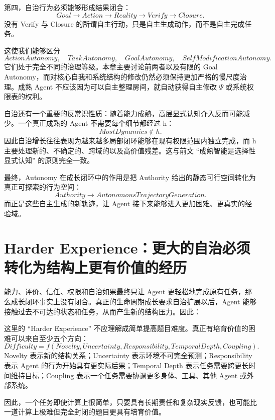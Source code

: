 第四，自治行为必须能够形成结果闭合：
\[
Goal
\rightarrow
Action
\rightarrow
Reality
\rightarrow
Verify
\rightarrow
Closure.
\]
没有 Verify 与 Closure 的所谓自主行动，只是自主生成动作，而不是自主完成任务。

这使我们能够区分
\[
ActionAutonomy,
\quad
TaskAutonomy,
\quad
GoalAutonomy,
\quad
SelfModificationAutonomy.
\]
它们处于完全不同的治理等级。本章主要讨论前两者以及有限的 Goal Autonomy，而对核心自我和系统结构的修改仍然必须保持更加严格的慢尺度治理。成熟 Agent 不应该因为可以自主整理房间，就自动获得自主修改 $\Psi$ 或系统权限表的权利。

自治还有一个重要的反常识性质：随着能力成熟，高层显式认知介入反而可能减少。一个真正成熟的 Agent 不需要每个细节都经过 h：
\[
MostDynamics
\notin h.
\]
因此自治增长往往表现为越来越多局部闭环能够在现有权限范围内独立完成，而 h 主要处理新的、不确定的、跨域的以及高价值残差。这与前文 ``成熟智能是选择性显式认知'' 的原则完全一致。

最终，Autonomy 在成长闭环中的作用是把 Authority 给出的静态可行空间转化为真正可探索的行为空间：
\[
Authority
\rightarrow
AutonomousTrajectoryGeneration.
\]
而正是这些自主生成的新轨迹，让 Agent 接下来能够进入更加困难、更真实的经验域。

\section{Harder Experience：更大的自治必须转化为结构上更有价值的经历}

能力、评价、信任、权限和自治如果最终只让 Agent 更轻松地完成原有任务，那么成长闭环事实上没有闭合。真正的生命周期成长要求自治扩展以后，Agent 能够接触过去不可达的状态和任务，从而产生新的结构压力。因此：
\begin{statementbox}
\centering
{}
\end{statementbox}

这里的 ``Harder Experience'' 不应理解成简单提高题目难度。真正有培育价值的困难可以来自至少五个方向：
\[
Difficulty
=
f(
Novelty,
Uncertainty,
Responsibility,
TemporalDepth,
Coupling
).
\]
Novelty 表示新的结构关系；Uncertainty 表示环境不可完全预测；Responsibility 表示 Agent 的行为开始具有更实际后果；Temporal Depth 表示任务需要跨更长时间维持目标；Coupling 表示一个任务需要协调更多身体、工具、其他 Agent 或外部系统。

因此，一个任务即使计算上很简单，只要具有长期责任和复杂现实反馈，也可能比一道计算上极难但完全封闭的题目更具有培育价值。

